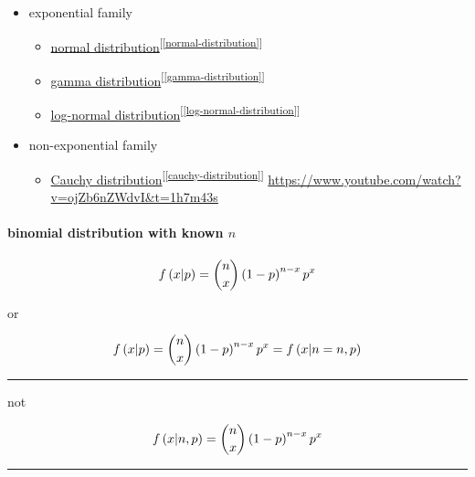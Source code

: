 \documentclass[
]{book}
\providecommand{\tightlist}{%
  \setlength{\itemsep}{0pt}\setlength{\parskip}{0pt}}
\theoremstyle{definition}
\theoremstyle{definition}
\theoremstyle{definition}
\theoremstyle{definition}
\theoremstyle{remark}
\begin{document}
\begin{itemize}
\tightlist
\item
  exponential family

  \begin{itemize}
  \tightlist
  \item
    \hyperref[normal-distribution]{normal distribution}\textsuperscript{{[}\ref{normal-distribution}{]}}
  \item
    \hyperref[gamma-distribution]{gamma distribution}\textsuperscript{{[}\ref{gamma-distribution}{]}}
  \item
    \hyperref[log-normal-distribution]{log-normal distribution}\textsuperscript{{[}\ref{log-normal-distribution}{]}}
  \end{itemize}
\item
  non-exponential family

  \begin{itemize}
  \tightlist
  \item
    \hyperref[cauchy-distribution]{Cauchy distribution}\textsuperscript{{[}\ref{cauchy-distribution}{]}} \url{https://www.youtube.com/watch?v=ojZb6nZWdvI&t=1h7m43s}
  \end{itemize}
\end{itemize}

\paragraph{\texorpdfstring{binomial distribution with known \(n\)}{binomial distribution with known n}}\label{binomial-distribution-with-known-n}

\[
f\left(x|p\right)=\dbinom{n}{x}\left(1-p\right)^{n-x}p^{x}
\]

or

\[
f\left(x|p\right)=\dbinom{n}{x}\left(1-p\right)^{n-x}p^{x}=f\left(x|n=n,p\right)
\]

\begin{center}\rule{0.5\linewidth}{0.5pt}\end{center}

not

\[
f\left(x|n,p\right)=\dbinom{n}{x}\left(1-p\right)^{n-x}p^{x}
\]

\begin{center}\rule{0.5\linewidth}{0.5pt}\end{center}
\end{document}
